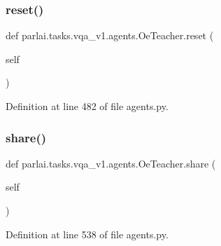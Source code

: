 \subsubsection{\texorpdfstring{reset()}{reset()}}
{\footnotesize\ttfamily def parlai.\+tasks.\+vqa\+\_\+v1.\+agents.\+Oe\+Teacher.\+reset (\begin{DoxyParamCaption}\item[{}]{self }\end{DoxyParamCaption})}



Definition at line 482 of file agents.\+py.

\mbox{\label{classparlai_1_1tasks_1_1vqa__v1_1_1agents_1_1OeTeacher_ae61f906342533a155cfbcad318657ce9}} 
\subsubsection{\texorpdfstring{share()}{share()}}
{\footnotesize\ttfamily def parlai.\+tasks.\+vqa\+\_\+v1.\+agents.\+Oe\+Teacher.\+share (\begin{DoxyParamCaption}\item[{}]{self }\end{DoxyParamCaption})}



Definition at line 538 of file agents.\+py.



